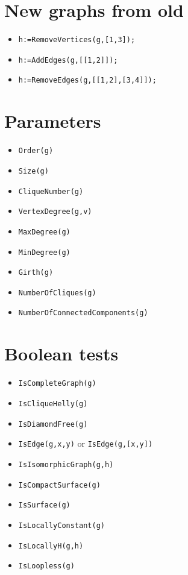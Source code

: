 \documentclass[11pt]{article}
\begin{document}
\begin{multicols}{3}
\section{New graphs from old}
\label{sec:orgba10ae6}

\begin{itemize}
\item \texttt{h:=RemoveVertices(g,[1,3]);}
\item \texttt{h:=AddEdges(g,[[1,2]]);}
\item \texttt{h:=RemoveEdges(g,[[1,2],[3,4]]);}
\end{itemize}

\section{Parameters}
\label{sec:org75df7db}

\begin{itemize}
\item \texttt{Order(g)}
\item \texttt{Size(g)}
\item \texttt{CliqueNumber(g)}
\item \texttt{VertexDegree(g,v)}
\item \texttt{MaxDegree(g)}
\item \texttt{MinDegree(g)}
\item \texttt{Girth(g)}
\item \texttt{NumberOfCliques(g)}
\item \texttt{NumberOfConnectedComponents(g)}
\end{itemize}

\section{Boolean tests}
\label{sec:org6acb5eb}
\begin{itemize}
\item \texttt{IsCompleteGraph(g)}
\item \texttt{IsCliqueHelly(g)}
\item \texttt{IsDiamondFree(g)}
\item \texttt{IsEdge(g,x,y)} or \texttt{IsEdge(g,[x,y])}
\item \texttt{IsIsomorphicGraph(g,h)}
\item \texttt{IsCompactSurface(g)}
\item \texttt{IsSurface(g)}
\item \texttt{IsLocallyConstant(g)}
\item \texttt{IsLocallyH(g,h)}
\item \texttt{IsLoopless(g)}
\end{itemize}


\end{multicols}
\end{document}
